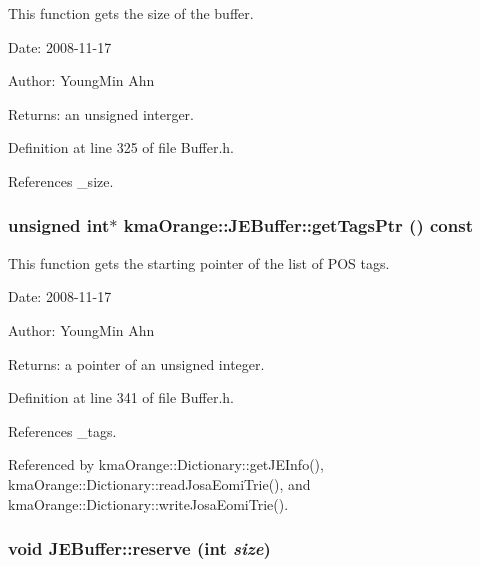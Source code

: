 This function gets the size of the buffer. 

\begin{Desc}
\item[Date:]2008-11-17 \end{Desc}
\begin{Desc}
\item[Author:]YoungMin Ahn \end{Desc}
\begin{Desc}
\item[Returns:]an unsigned interger. \end{Desc}


Definition at line 325 of file Buffer.h.

References \_\-size.\hypertarget{classkmaOrange_1_1JEBuffer_895da3d5f392bd96761102d707ac54f4}{
\subsubsection[{getTagsPtr}]{\setlength{\rightskip}{0pt plus 5cm}unsigned int$\ast$ kmaOrange::JEBuffer::getTagsPtr () const}}
\label{classkmaOrange_1_1JEBuffer_895da3d5f392bd96761102d707ac54f4}


This function gets the starting pointer of the list of POS tags. 

\begin{Desc}
\item[Date:]2008-11-17 \end{Desc}
\begin{Desc}
\item[Author:]YoungMin Ahn \end{Desc}
\begin{Desc}
\item[Returns:]a pointer of an unsigned integer. \end{Desc}


Definition at line 341 of file Buffer.h.

References \_\-tags.

Referenced by kmaOrange::Dictionary::getJEInfo(), kmaOrange::Dictionary::readJosaEomiTrie(), and kmaOrange::Dictionary::writeJosaEomiTrie().\hypertarget{classkmaOrange_1_1JEBuffer_481e90a2667cfc2948edab85edea8f39}{
\subsubsection[{reserve}]{\setlength{\rightskip}{0pt plus 5cm}void JEBuffer::reserve (int {\em size})}}
\label{classkmaOrange_1_1JEBuffer_481e90a2667cfc2948edab85edea8f39}


